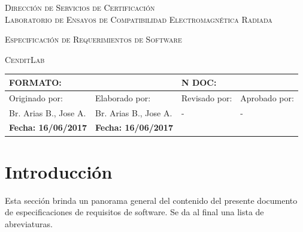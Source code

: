 \documentclass[paper=a4,oneside,fontsize=12pt]{article}
\newcommand{\AppName}{\textsc{CenditLab}\xspace}
\begin{document}
	
		\begin{center} 			
			\begin{Large} 
				\textsc{Dirección de Servicios de Certificación}
				\\[5pt]
				\textsc{Laboratorio de Ensayos de Compatibilidad Electromagnética Radiada}
			\end{Large}
				
				\vspace{10cm}
			\begin{LARGE}			
				\textsc{Especificación de Requerimientos de Software}
			\end{LARGE}
		
			\vspace{8pt}
		
			\begin{Huge}
				\textsc{\AppName}
			\end{Huge}
		
			\begin{table}[!b]
				\begin{tabularx}{\linewidth}{|X|X|X|X|}	
					\hline				
					\multicolumn{2}{|l|}{\textbf{FORMATO}: } & \multicolumn{2}{|l|}{\textbf{N DOC:}} \\
					\hline
					Originado por:	& Elaborado por: & Revisado por: & Aprobado por: \\
					\hline
					Br. Arias B., Jose A. & Br. Arias B., Jose A. & - & - \\
					\hline
					\textbf{Fecha: 16/06/2017} & \textbf{Fecha: 16/06/2017} & & \\				
					\hline
				\end{tabularx}	
			\end{table}		
		
		\end{center}
		
	
	\clearpage
	
	\tableofcontents
	
	\clearpage
	
	\setlength{\parskip}{0.5em}
	
	\section{Introducción}
	Esta sección brinda un panorama general del contenido del presente documento de especificaciones de requisitos de software. Se da al final una lista de abreviaturas.
	
\end{document}
